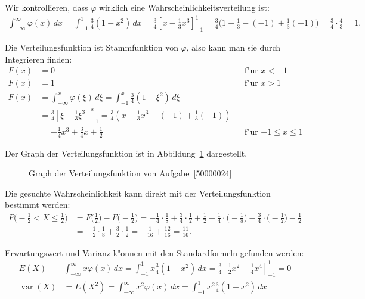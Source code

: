 \begin{loesung}
Wir kontrollieren, dass $\varphi$ wirklich eine Wahrscheinlichkeitsverteilung
ist:
\begin{align*}
\int_{-\infty}^{\infty}\varphi(x)\,dx
=
\int_{-1}^1 \frac34(1-x^2)\,dx
=
\frac34\left[
x-\frac13x^3
\right]_{-1}^1
=
\frac34\biggl(1-\frac13-(-1)+\frac13(-1)\biggr)
=
\frac34\cdot\frac43
=1.
\end{align*}
\begin{teilaufgaben}
\item Die Verteilungsfunktion ist Stammfunktion von $\varphi$, also kann man sie
durch Integrieren finden:
\begin{align*}
F(x)&=0&&\text{f"ur $x < -1$}\\
F(x)&=1&&\text{f"ur $x > 1$}\\
F(x)&=\int_{-\infty}^x\varphi(\xi)\,d\xi =\int_{-1}^x\frac34(1-\xi^2)\,d\xi
\\
&=
\frac34\left[
\xi -\frac13\xi^3
\right]_{-1}^x
=\frac34(x-\frac13x^3-(-1)+\frac13(-1))
\\
&=-\frac14x^3+\frac34x+\frac12&&\text{f"ur $-1\le x\le 1$}
\end{align*}
\item Der Graph der Verteilungsfunktion ist in
Abbildung~\ref{50000024:verteilungsfunktion} dargestellt.
\begin{figure}
\centering
{}
\caption{Graph der Verteilungsfunktion von Aufgabe~\ref{50000024}
\label{50000024:verteilungsfunktion}}
\end{figure}
\item Die gesuchte Wahrscheinlichkeit kann direkt mit der Verteilungsfunktion
bestimmt werden:
\begin{align*}
P\biggl(-\frac12<X\le \frac12\biggr)
&=
F\biggl(\frac12\biggr)-F\biggl(-\frac12\biggr)
=
-\frac14\cdot\frac18+\frac34\cdot\frac12+\frac12
+\frac14\cdot\biggl(-\frac18\biggr)-\frac34\cdot\biggl(-\frac12\biggr)-\frac12
\\
&=-\frac12\cdot\frac18+\frac32\cdot\frac12
=
-\frac1{16}+\frac{12}{16}
=
\frac{11}{16}.
\end{align*}
\item Erwartungswert und Varianz k"onnen mit den Standardformeln gefunden 
werden:
\begin{align*}
E(X)&
\int_{-\infty}^{\infty}x\varphi(x)\,dx=\int_{-1}^1x \frac34(1-x^2)\,dx
=\frac34\left[\frac12x^2-\frac14x^4\right]_{-1}^1
=0\\
\operatorname{var}(X)&=E(X^2)=
\int_{-\infty}^{\infty}x^2\varphi(x)\,dx=\int_{-1}^1x^2\frac34(1-x^2)\,dx

\end{align*}
\end{teilaufgaben}
\end{loesung}
